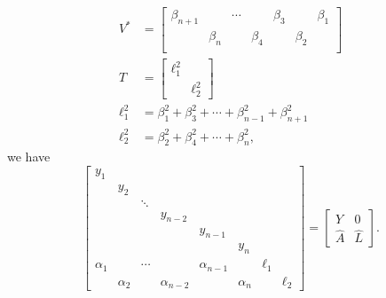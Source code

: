 \begin{align}
    V^{*} &= \begin{bmatrix}
        \beta_{n+1} & & \cdots & & \beta_{3} & & \beta_{1} \\
        & \beta_{n} & & \beta_{4} & & \beta_{2} \\
    \end{bmatrix} \nonumber\\
    T &= \begin{bmatrix} \ell_{1}^{2} & \\ & \ell_{2}^{2} \end{bmatrix}
        \nonumber\\
    \ell_{1}^{2} &= \beta_{1}^{2} + \beta_{3}^{2} + \cdots + \beta_{n-1}^{2}
            + \beta_{n+1}^{2} \nonumber\\
    \ell_{2}^{2} &= \beta_{2}^{2} + \beta_{4}^{2} + \cdots + \beta_{n}^{2},
\end{align}
%
we have
%
\begin{equation}
    \begin{bmatrix}
        y_{1} & \\
        & y_{2} & \\
        & & \ddots & \\
        & & & y_{n-2} \\
        & & & & y_{n-1} \\
        & & & & & y_{n} \\
        \alpha_{1} & & \cdots & & \alpha_{n-1} & & \ell_{1} \\
        & \alpha_{2} & & \alpha_{n-2} & & \alpha_{n} & & \ell_{2}
    \end{bmatrix}
        = \begin{bmatrix} Y & 0 \\ \widehat{A} & \widehat{L} \end{bmatrix}.
\end{equation}


